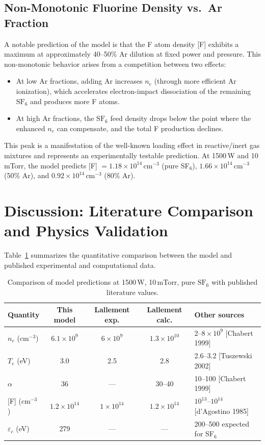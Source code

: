 \documentclass[11pt,a4paper]{article}
\newcommand{\SFsix}{\mathrm{SF}_6}
\newcommand{\Te}{T_e}
\newcommand{\ne}{n_e}
\begin{document}
\subsection{Non-Monotonic Fluorine Density vs.\ Ar Fraction}

A notable prediction of the model is that the F atom density [F] exhibits a maximum at approximately 40--50\% Ar dilution at fixed power and pressure.  This non-monotonic behavior arises from a competition between two effects:
\begin{itemize}
\item At low Ar fractions, adding Ar increases $\ne$ (through more efficient Ar ionization), which accelerates electron-impact dissociation of the remaining $\SFsix$ and produces more F atoms.
\item At high Ar fractions, the $\SFsix$ feed density drops below the point where the enhanced $\ne$ can compensate, and the total F production declines.
\end{itemize}
This peak is a manifestation of the well-known loading effect in reactive/inert gas mixtures and represents an experimentally testable prediction.  At 1500\,W and 10\,mTorr, the model predicts [F] $= 1.18 \times 10^{14}$\,cm$^{-3}$ (pure SF$_6$), $1.66 \times 10^{14}$\,cm$^{-3}$ (50\% Ar), and $0.92 \times 10^{14}$\,cm$^{-3}$ (80\% Ar).

\section{Discussion: Literature Comparison and Physics Validation}
\label{sec:discussion}

Table~\ref{tab:comparison} summarizes the quantitative comparison between the model and published experimental and computational data.

\begin{table}[H]
\centering
\caption{Comparison of model predictions at 1500\,W, 10\,mTorr, pure $\SFsix$ with published literature values.}
\label{tab:comparison}
\small
\begin{tabular}{lcccl}
\toprule
Quantity & This model & Lallement exp. & Lallement calc. & Other sources \\
\midrule
$\ne$ (cm$^{-3}$) & $6.1 \times 10^9$ & $6 \times 10^9$ & $1.3 \times 10^{10}$ & $2$--$8 \times 10^9$ [Chabert 1999] \\
$\Te$ (eV) & 3.0 & 2.5 & 2.8 & 2.6--3.2 [Tuszewski 2002] \\
$\alpha$ & 36 & --- & 30--40 & 10--100 [Chabert 1999] \\
{[F]} (cm$^{-3}$) & $1.2 \times 10^{14}$ & $1 \times 10^{14}$ & $1.2 \times 10^{14}$ & $10^{13}$--$10^{14}$ [d'Agostino 1985] \\
$\varepsilon_c$ (eV) & 279 & --- & --- & 200--500 expected for SF$_6$ \\
\bottomrule
\end{tabular}
\end{table}
\end{document}
